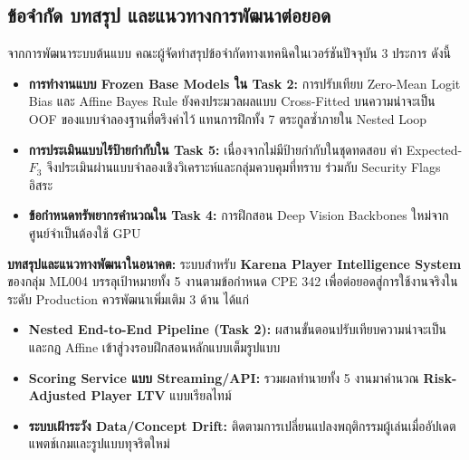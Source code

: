 \documentclass[11pt,a4paper]{article}
\DeclareRobustCommand{\code}[1]{\leavevmode{\ttfamily\color{KeyGreen!85!black}\let\codeunderscore\_\def\_{\codeunderscore\allowbreak}\hyphenpenalty=50\exhyphenpenalty=50\relax#1}}
\begin{document}
\clearpage
\subsection{ข้อจำกัด บทสรุป และแนวทางการพัฒนาต่อยอด}

จากการพัฒนาระบบต้นแบบ คณะผู้จัดทำสรุปข้อจำกัดทางเทคนิคในเวอร์ชันปัจจุบัน 3 ประการ ดังนี้
\begin{itemize}
    \item \textbf{การทำงานแบบ Frozen Base Models ใน Task 2:} การปรับเทียบ Zero-Mean Logit Bias และ Affine Bayes Rule ยังคงประมวลผลแบบ Cross-Fitted บนความน่าจะเป็น OOF ของแบบจำลองฐานที่ตรึงค่าไว้ แทนการฝึกทั้ง 7 ตระกูลซ้ำภายใน Nested Loop
    \item \textbf{การประเมินแบบไร้ป้ายกำกับใน Task 5:} เนื่องจากไม่มีป้ายกำกับในชุดทดสอบ ค่า Expected-$F_3$ จึงประเมินผ่านแบบจำลองเชิงวิเคราะห์และกลุ่มควบคุมที่ทราบ \code{behavior\_stability} ร่วมกับ Security Flags อิสระ
    \item \textbf{ข้อกำหนดทรัพยากรคำนวณใน Task 4:} การฝึกสอน Deep Vision Backbones ใหม่จากศูนย์จำเป็นต้องใช้ GPU
\end{itemize}

\textbf{บทสรุปและแนวทางพัฒนาในอนาคต:} ระบบสำหรับ \textbf{Karena Player Intelligence System} ของกลุ่ม ML004 บรรลุเป้าหมายทั้ง 5 งานตามข้อกำหนด CPE 342 เพื่อต่อยอดสู่การใช้งานจริงในระดับ Production ควรพัฒนาเพิ่มเติม 3 ด้าน ได้แก่
\begin{itemize}
    \item \textbf{Nested End-to-End Pipeline (Task 2):} ผสานขั้นตอนปรับเทียบความน่าจะเป็นและกฎ Affine เข้าสู่วงรอบฝึกสอนหลักแบบเต็มรูปแบบ
    \item \textbf{Scoring Service แบบ Streaming/API:} รวมผลทำนายทั้ง 5 งานมาคำนวณ \textbf{Risk-Adjusted Player LTV} แบบเรียลไทม์
    \item \textbf{ระบบเฝ้าระวัง Data/Concept Drift:} ติดตามการเปลี่ยนแปลงพฤติกรรมผู้เล่นเมื่ออัปเดตแพตช์เกมและรูปแบบทุจริตใหม่
\end{itemize}
\end{document}
